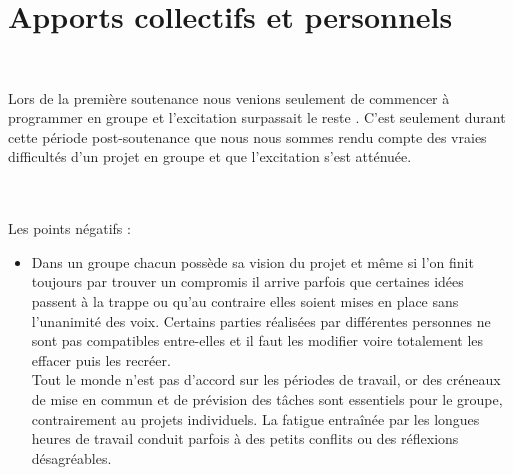 \documentclass[titlepage, 13px, a4paper]{report}
\begin{document}
\part{Apports collectifs et personnels}
\paragraph{} \hspace{0pt} \\
Lors de la première soutenance nous venions seulement de commencer à  programmer en groupe et l’excitation surpassait le reste . 
C'est seulement durant cette période post-soutenance que nous
nous sommes rendu compte des vraies difficultés d'un projet en groupe et que l'excitation s’est atténuée. \\

\paragraph{} \hspace{0pt} \\
Les points négatifs :
{\begin{itemize}
	\item	Dans un groupe chacun possède sa vision du projet et même si l'on finit toujours par trouver un compromis il arrive parfois que 
		certaines idées passent à la trappe ou qu'au contraire elles soient mises en place sans l'unanimité des voix.
		Certains parties réalisées par différentes personnes ne sont pas compatibles entre-elles et il faut les modifier voire totalement 
		les effacer puis les recréer. \\
		Tout le monde n'est pas d'accord sur les périodes de travail, or des créneaux de mise en commun
		et de prévision des tâches sont essentiels pour le groupe, contrairement au projets individuels.
		La fatigue entraînée par les longues heures de travail conduit parfois à des petits conflits ou des réflexions désagréables. \\
\end{itemize}} 
\end{document}

